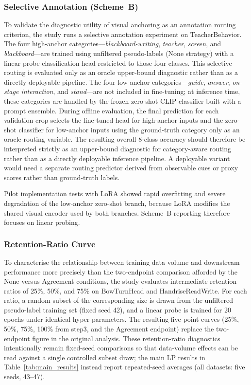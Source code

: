 \documentclass[10pt,letterpaper]{article}
\begin{document}
\subsubsection*{Selective Annotation (Scheme~B)}

To validate the diagnostic utility of visual anchoring as an annotation
routing criterion, the study runs a selective annotation experiment on
TeacherBehavior.
The four high-anchor categories---\textit{blackboard-writing},
\textit{teacher}, \textit{screen}, and \textit{blackboard}---are
trained using unfiltered pseudo-labels (None strategy) with a linear
probe classification head restricted to those four classes.
This selective routing is evaluated only as an oracle upper-bound
diagnostic rather than as a directly deployable pipeline.
The four low-anchor categories---\textit{guide}, \textit{answer},
\textit{on-stage interaction}, and \textit{stand}---are not included
in fine-tuning; at inference time, these categories are handled by the
frozen zero-shot CLIP classifier built with a prompt ensemble.
During offline evaluation, the final prediction for each validation
crop selects the fine-tuned head for high-anchor inputs and the
zero-shot classifier for low-anchor inputs using the ground-truth
category only as an oracle routing variable.
The resulting overall 8-class accuracy should therefore be interpreted
strictly as an upper-bound diagnostic for category-aware routing rather
than as a directly deployable inference pipeline.
A deployable variant would need a separate routing predictor derived
from observable cues or proxy scores rather than ground-truth labels.

Pilot implementation tests with LoRA showed rapid overfitting and
severe degradation of the low-anchor zero-shot branch, because LoRA
modifies the shared visual encoder used by both branches.
Scheme~B reporting therefore focuses on linear probing.

\subsubsection*{Retention-Ratio Curve}

To characterise the relationship between training data volume and
downstream performance more precisely than the two-endpoint comparison
afforded by the None versus Agreement conditions, the study evaluates
intermediate retention ratios of 25\%, 50\%, and 75\% on BowTurnHead
and HandriseReadWrite.
For each ratio, a random subset of the corresponding size is drawn
from the unfiltered pseudo-label training set (fixed seed 42), and
a linear probe is trained for 20 epochs under identical hyper-parameters.
The resulting five-point curves (25\%, 50\%, 75\%, 100\% from step3,
and the Agreement endpoint) replace the two-endpoint figure in the
original analysis. These retention-ratio diagnostics intentionally
remain fixed-seed comparisons so that data-volume effects can be read
against a single controlled subset draw; the main LP results in
Table~\ref{tab:main_results} instead report repeated-seed averages
(all datasets: five seeds, 43--47).
\end{document}
